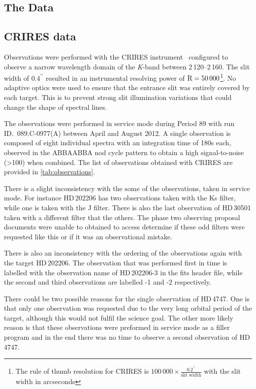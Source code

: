 


\subsection{The Data}

\subsection{CRIRES data}
\label{subsec:CRIRES}
Observations were performed with the {CRIRES} instrument~\citep{kaeufl_crires_2004} configured to observe a narrow wavelength domain of the \emph{K}-band between 2\,120--2\,160\nm{}.
The slit width of \(0.4^{\prime\prime}\) resulted in an instrumental resolving power of \(\textrm{R}=50\,000\)\footnote{The rule of thumb resolution for {CRIRES} is \(100\,000\times \frac{0.2^{\prime\prime}}{\textrm{slit width}}\) with the slit width in arcseconds}.
No adaptive optics were used to ensure that the entrance slit was entirely covered by each target.
This is to prevent strong slit illumination variations that could change the shape of spectral lines.

The observations were performed in service mode during Period 89 with run {ID.~089.C-0977(A)} between April and August 2012.
A single observation is composed of eight individual spectra with an integration time of 180\si{\second} each, observed in the {ABBAABBA} nod cycle pattern to obtain a high signal-to-noise (>100) when combined.
The list of observations obtained with {CRIRES} are provided in \cref{tab:observations}.

There is a slight inconsistency with the some of the observations, taken in service mode.
For instance {HD\,202206} has two observations taken with the {Ks} filter, while one is taken with the {J} filter.
There is also the last observation of {HD\,30501} taken with a different filter that the others.
The phase two observing proposal documents were unable to obtained to access determine if these odd filters were requested like this or if it was an observational mistake.

There is also an inconsistency with the ordering of the observations again with the target {HD\,202206}.
The observation that was performed first in time is labelled with the observation name of {HD\,202206-3} in the fits header file, while the second and third observations are labelled -1 and -2 respectively.

There could be two possible reasons for the single observation of {HD\,4747}.
One is that only one observation was requested due to the very long orbital period of the target, although this would not fulfil the science goal.
The other more likely reason is that these observations were preformed in service mode as a filler program and in the end there was no time to observe a second observation of {HD\,4747}.

